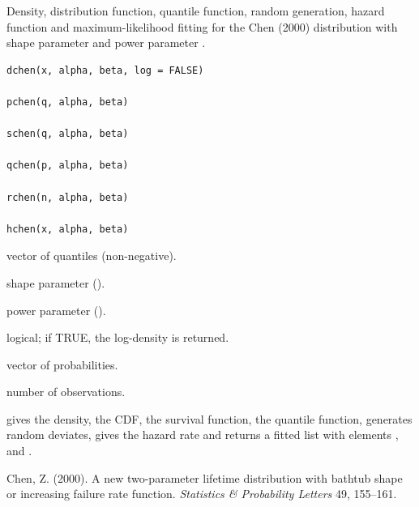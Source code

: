 \documentclass[11pt,a4paper]{article}
\begin{document}
%
\begin{Description}
Density, distribution function, quantile function,
random generation, hazard function and maximum-likelihood fitting
for the Chen (2000) distribution with shape parameter 
and power parameter .
\end{Description}
%
\begin{Usage}
\begin{verbatim}
dchen(x, alpha, beta, log = FALSE)

pchen(q, alpha, beta)

schen(q, alpha, beta)

qchen(p, alpha, beta)

rchen(n, alpha, beta)

hchen(x, alpha, beta)
\end{verbatim}
\end{Usage}
%
\begin{Arguments}
\begin{ldescription}
\item[\code{x}, \code{q}] vector of quantiles (non-negative).

\item[\code{alpha}] shape parameter ().

\item[\code{beta}] power parameter ().

\item[\code{log}] logical; if TRUE, the log-density is returned.

\item[\code{p}] vector of probabilities.

\item[\code{n}] number of observations.
\end{ldescription}
\end{Arguments}
%
\begin{Value}
 gives the density,  the CDF,
 the survival function,  the quantile
function,  generates random deviates, 
gives the hazard rate and  returns a fitted list
with elements ,  and .
\end{Value}
%
\begin{References}
Chen, Z. (2000). A new two-parameter lifetime distribution
with bathtub shape or increasing failure rate function.
\emph{Statistics \& Probability Letters} 49, 155--161.
\end{References}
%
\end{document}
